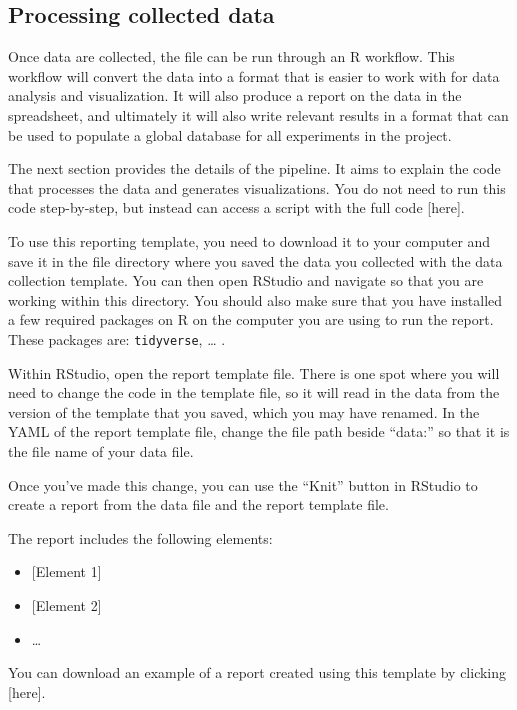 \documentclass[
]{book}
\providecommand{\tightlist}{%
  \setlength{\itemsep}{0pt}\setlength{\parskip}{0pt}}
\begin{document}
\hypertarget{processing-collected-data-2}{%
\subsection{Processing collected data}\label{processing-collected-data-2}}

Once data are collected, the file can be run through an R workflow. This workflow
will convert the data into a format that is easier to work with for data analysis
and visualization. It will also produce a report on the data in the spreadsheet, and
ultimately it will also write relevant results in a format that can be used
to populate a global database for all experiments in the project.

The next section provides the details of the pipeline. It aims to explain the
code that processes the data and generates visualizations. You do not need to
run this code step-by-step, but instead can access a script with the full
code {[}here{]}.

To use this reporting template, you need to download it to your computer and
save it in the file directory where you saved the data you collected with the
data collection template. You can then open RStudio and navigate so that you are
working within this directory. You should also make sure that you have installed
a few required packages on R on the computer you are using to run the report.
These packages are: \texttt{tidyverse}, \ldots{} .

Within RStudio, open the report template file. There is one spot where you will
need to change the code in the template file, so it will read in the data from
the version of the template that you saved, which you may have renamed.
In the YAML of the report template file, change the file path beside ``data:''
so that it is the file name of your data file.

Once you've made this change, you can use the ``Knit'' button in RStudio to
create a report from the data file and the report template file.

The report includes the following elements:

\begin{itemize}
\tightlist
\item
  {[}Element 1{]}
\item
  {[}Element 2{]}
\item
  \ldots{}
\end{itemize}

You can download an example of a report created using this template by
clicking {[}here{]}.
\end{document}
